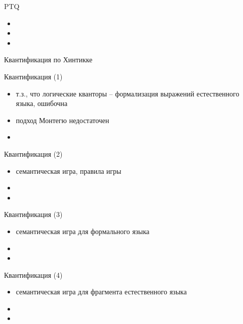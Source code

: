 \documentclass{beamer}
\begin{document}
\begin{frame}{PTQ}
\begin{itemize}
	\item 
	\item 
	\item 
\end{itemize}
\end{frame}

\begin{frame}{}
\begin{center}
Квантификация по Хинтикке
\end{center}
\end{frame}

\begin{frame}{Квантификация (1)}
\begin{itemize}
	\item т.з., что логические кванторы -- формализация выражений естественного языка, ошибочна
	\item подход Монтегю недостаточен
	\item 
\end{itemize}
\end{frame}

\begin{frame}{Квантификация (2)}
\begin{itemize}
	\item семантическая игра, правила игры
	\item 
	\item 
\end{itemize}
\end{frame}

\begin{frame}{Квантификация (3)}
\begin{itemize}
	\item семантическая игра для формального языка
	\item 
	\item 
\end{itemize}
\end{frame}

\begin{frame}{Квантификация (4)}
\begin{itemize}
	\item семантическая игра для фрагмента естественного языка
	\item 
	\item 
\end{itemize}
\end{frame}
\end{document}
